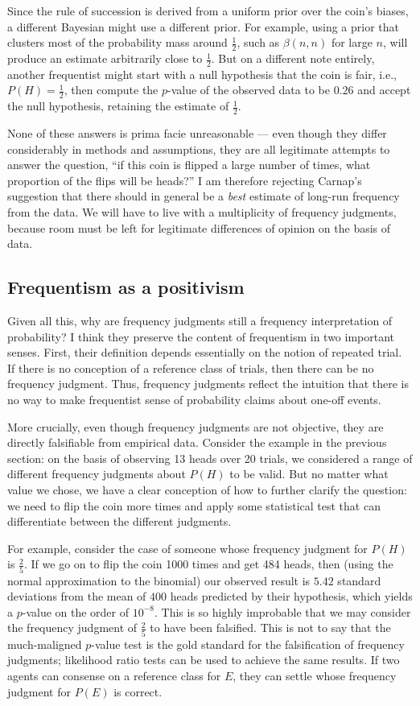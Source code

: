 \documentclass[letterpaper,12pt]{article}
\begin{document}
Since the rule of succession is derived from a uniform prior over the coin's biases, a different Bayesian might use a different prior. For example, using a prior that clusters most of the probability mass around $\frac{1}{2}$, such as $\beta(n, n)$ for large $n$, will produce an estimate arbitrarily close to $\frac{1}{2}$. But on a different note entirely, another frequentist might start with a null hypothesis that the coin is fair, i.e., $P(H) = \frac{1}{2}$, then compute the $p$-value of the observed data to be $0.26$ and accept the null hypothesis, retaining the estimate of $\frac{1}{2}$.

None of these answers is prima facie unreasonable --- even though they differ considerably in methods and assumptions, they are all legitimate attempts to answer the question, ``if this coin is flipped a large number of times, what proportion of the flips will be heads?'' I am therefore rejecting Carnap's suggestion that there should in general be a \emph{best} estimate of long-run frequency from the data. We will have to live with a multiplicity of frequency judgments, because room must be left for legitimate differences of opinion on the basis of data.

\subsection{Frequentism as a positivism}
Given all this, why are frequency judgments still a frequency interpretation of probability? I think they preserve the content of frequentism in two important senses. First, their definition depends essentially on the notion of repeated trial. If there is no conception of a reference class of trials, then there can be no frequency judgment. Thus, frequency judgments reflect the intuition that there is no way to make frequentist sense of probability claims about one-off events.

More crucially, even though frequency judgments are not objective, they are directly falsifiable from empirical data. Consider the example in the previous section: on the basis of observing 13 heads over 20 trials, we considered a range of different frequency judgments about $P(H)$ to be valid. But no matter what value we chose, we have a clear conception of how to further clarify the question: we need to flip the coin more times and apply some statistical test that can differentiate between the different judgments.

For example, consider the case of someone whose frequency judgment for $P(H)$ is $\frac{2}{5}$. If we go on to flip the coin 1000 times and get 484 heads, then (using the normal approximation to the binomial) our observed result is $5.42$ standard deviations from the mean of $400$ heads predicted by their hypothesis, which yields a $p$-value on the order of $10^{-8}$. This is so highly improbable that we may consider the frequency judgment of $\frac{2}{5}$ to have been falsified. This is not to say that the much-maligned $p$-value test is the gold standard for the falsification of frequency judgments; likelihood ratio tests can be used to achieve the same results. If two agents can consense on a reference class for $E$, they can settle whose frequency judgment for $P(E)$ is correct.
\end{document}
